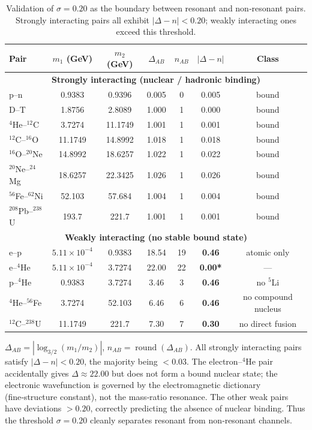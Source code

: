 \documentclass[12pt,a4paper]{article}
\begin{document}
\begin{table}[H]
	\centering
	\caption{Validation of $\sigma = 0.20$ as the boundary between resonant and non‑resonant pairs. Strongly interacting pairs all exhibit $|\Delta-n| < 0.20$; weakly interacting ones exceed this threshold.}
	\label{tab:sigma_validation_heavy}
	\small
	\begin{tabular}{l c c c c c c}
		\toprule
		Pair & $m_1$ (GeV) & $m_2$ (GeV) & $\Delta_{AB}$ & $n_{AB}$ & $|\Delta-n|$ & Class \\
		\midrule
		\multicolumn{7}{c}{\textbf{Strongly interacting (nuclear / hadronic binding)}} \\
		p--n           & 0.9383 & 0.9396 & 0.005  & 0 & 0.005 & bound \\
		D--T           & 1.8756 & 2.8089 & 1.000  & 1 & 0.000 & bound \\
		$^4$He--$^{12}$C  & 3.7274 & 11.1749& 1.001  & 1 & 0.001 & bound \\
		$^{12}$C--$^{16}$O & 11.1749& 14.8992& 1.018  & 1 & 0.018 & bound \\
		$^{16}$O--$^{20}$Ne& 14.8992& 18.6257& 1.022  & 1 & 0.022 & bound \\
		$^{20}$Ne--$^{24}$Mg& 18.6257& 22.3425& 1.026  & 1 & 0.026 & bound \\
		$^{56}$Fe--$^{62}$Ni& 52.103 & 57.684 & 1.004  & 1 & 0.004 & bound \\
		$^{208}$Pb--$^{238}$U& 193.7  & 221.7  & 1.001  & 1 & 0.001 & bound \\
		\midrule
		\multicolumn{7}{c}{\textbf{Weakly interacting (no stable bound state)}} \\
		e--p           & $5.11\times10^{-4}$ & 0.9383 & 18.54  & 19 & \textbf{0.46} & atomic only \\
		e--$^4$He      & $5.11\times10^{-4}$ & 3.7274 & 22.00  & 22 & \textbf{0.00*} & — \\
		p--$^4$He      & 0.9383 & 3.7274 & 3.46   & 3  & \textbf{0.46} & no $^5$Li \\
		$^4$He--$^{56}$Fe & 3.7274 & 52.103 & 6.46   & 6  & \textbf{0.46} & no compound nucleus \\
		$^{12}$C--$^{238}$U& 11.1749& 221.7  & 7.30   & 7  & \textbf{0.30} & no direct fusion \\
		\bottomrule
	\end{tabular}
	\par\smallskip
	\footnotesize
	$\Delta_{AB} = |\log_{3/2}(m_1/m_2)|$, $n_{AB} = \operatorname{round}(\Delta_{AB})$. All strongly interacting pairs satisfy $|\Delta-n| < 0.20$, the majority being $<0.03$. The electron--$^4$He pair accidentally gives $\Delta\approx22.00$ but does not form a bound nuclear state; the electronic wavefunction is governed by the electromagnetic dictionary (fine‑structure constant), not the mass‑ratio resonance. The other weak pairs have deviations $>0.20$, correctly predicting the absence of nuclear binding. Thus the threshold $\sigma = 0.20$ cleanly separates resonant from non‑resonant channels.
\end{table}
\end{document}
